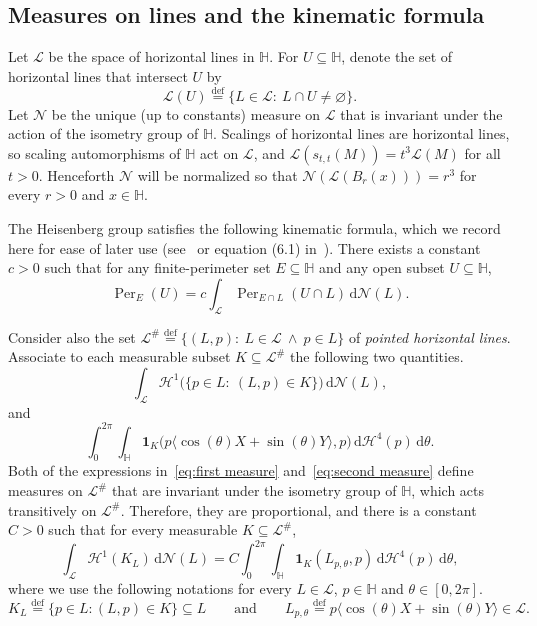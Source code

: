 \documentclass[11pt,reqno]{amsart}
\renewcommand{\H}{\mathbb{H}}
\newcommand{\cH}{\mathcal{H}}
\newcommand{\cL}{\mathcal{L}}
\newcommand{\cN}{\mathcal{N}}
\newcommand{\ud}[0]{\,\mathrm{d}}
\newcommand{\0}{\mathbf{0}}
\renewcommand{\1}{\mathbf 1}
\newcommand{\one}{\mathbf{1}}
\renewcommand{\mid}{:}
\renewcommand{\subset}{\subseteq}
\newcommand{\eqdef}{\stackrel{\mathrm{def}}{=}}
\renewcommand{\emptyset}{\varnothing}
\theoremstyle{remark}
\DeclareMathOperator{\Per}{Per}
\begin{document}
\subsection{Measures on lines and the kinematic formula}\label{sec:kinematic}

Let $\cL$ be the space of horizontal lines in $\H$.  For $U\subset \H$, denote    the set of horizontal lines that intersect $U$ by
$$\cL(U)\eqdef \{L\in \cL:\ L\cap U\neq \emptyset\}.
$$
Let $\cN$ be the unique (up to constants) measure on $\cL$ that is invariant under the action of the isometry group of $\H$.  Scalings of horizontal lines are horizontal lines, so scaling automorphisms of $\H$ act on $\cL$, and $\cL(s_{t,t}(M))=t^3 \cL(M)$ for all $t>0$.  Henceforth $\cN$ will be normalized  so that $\cN(\cL(B_r(x)))=r^3$ for every $r>0$ and $x\in \H$.

The Heisenberg group satisfies the following kinematic formula, which we record here for ease of later use (see~\cite{Mon05} or equation (6.1) in~\cite{CKN}).  There exists a constant $c>0$ such that for any finite-perimeter set $E\subset \H$ and any open subset $U\subset \H$,
\begin{equation}\label{eq:kinematic}
  \Per_E(U)=c\int_{\cL} \Per_{E\cap L}(U\cap L) \ud\cN(L).
\end{equation}

Consider also the set $\cL^\#\eqdef \{(L,p):\ L\in \cL\ \wedge \ p\in L\}$ of {\em pointed horizontal lines}. Associate to each measurable subset $K\subset \cL^\#$ the following two quantities.
\begin{equation}\label{eq:first measure}
\int_\cL \cH^1\big(\{p\in L:\ (L,p)\in K\}\big) \ud \cN(L),
\end{equation}
and
\begin{equation}\label{eq:second measure}
\int_0^{2\pi}\int_{\H} \one_{K}\big(p\langle \cos (\theta )X+\sin(\theta)Y\rangle ,p\big) \ud\cH^4(p) \ud\theta.
\end{equation}
Both of the expressions in~\eqref{eq:first measure} and~\eqref{eq:second measure}   define measures on $\cL^\#$ that are invariant under the isometry group of $\H$, which acts transitively on $\cL^\#$. Therefore, they are proportional, and there is a constant $C>0$ such that for every measurable $K\subset \cL^\#$,
\begin{equation}\label{eq:pointed line identity}
\int_\cL \cH^1(K_L) \ud \cN(L) = C \int_{0}^{2\pi} \int_{\H} \one_{K}(L_{p,\theta},p) \ud\cH^4(p) \ud\theta,
\end{equation}
where we use the following notations for every $L\in \cL$, $p\in \H$ and $\theta\in [0,2\pi]$.
\begin{equation}\label{eq:L p theta}
K_L\eqdef \{p\in L\mid (L,p)\in K\}\subset L\qquad\mathrm{and}\qquad L_{p,\theta}\eqdef p\langle \cos (\theta )X+\sin(\theta)Y\rangle  \in \cL.
\end{equation}
\end{document}
